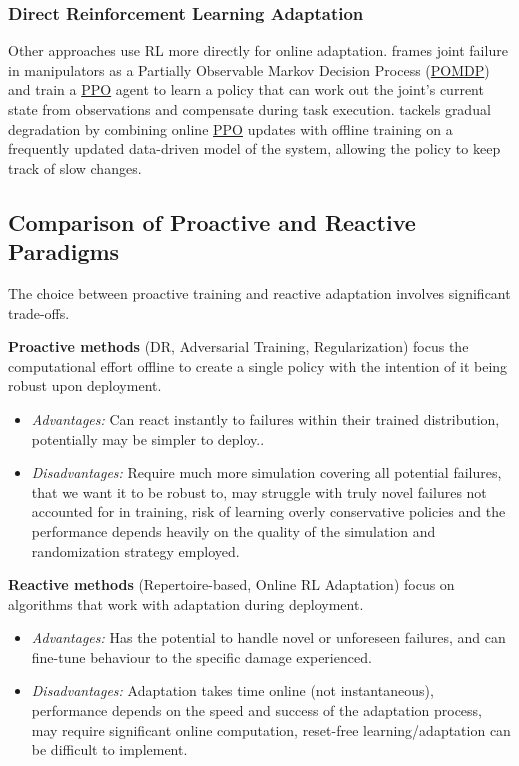 \documentclass[12pt, a4paper]{article} %
\begin{document}
\subsubsection{Direct Reinforcement Learning Adaptation}
Other approaches use RL more directly for online adaptation. \citet{pham2024adaptive} frames joint failure in manipulators as a Partially Observable Markov Decision Process (\hyperref[def:pomdp]{POMDP}) and train a \hyperref[def:ppo]{PPO} agent to learn a policy that can work out the joint's current state from observations and compensate during task execution. \citet{ahmed2020fault} tackels gradual degradation by combining online \hyperref[def:ppo]{PPO} updates with offline training on a frequently updated data-driven model of the system, allowing the policy to keep track of slow changes.

\subsection{Comparison of Proactive and Reactive Paradigms}
The choice between proactive training and reactive adaptation involves significant trade-offs.

\textbf{Proactive methods} (DR, Adversarial Training, Regularization) focus the computational effort offline to create a single policy with the intention of it being robust upon deployment.
\begin{itemize}
    \item \textit{Advantages:} Can react instantly to failures within their trained distribution, potentially may be simpler to deploy..
    \item \textit{Disadvantages:} Require much more simulation covering all potential failures, that we want it to be robust to, may struggle with truly novel failures not accounted for in training, risk of learning overly conservative policies and the performance depends heavily on the quality of the simulation and randomization strategy employed.
\end{itemize}

\textbf{Reactive methods} (Repertoire-based, Online RL Adaptation) focus on algorithms that work with adaptation during deployment.
\begin{itemize}
    \item \textit{Advantages:} Has the potential to handle novel or unforeseen failures, and can fine-tune behaviour to the specific damage experienced.
    \item \textit{Disadvantages:} Adaptation takes time online (not instantaneous), performance depends on the speed and success of the adaptation process, may require significant online computation, reset-free learning/adaptation can be difficult to implement.
\end{itemize}
\end{document}
